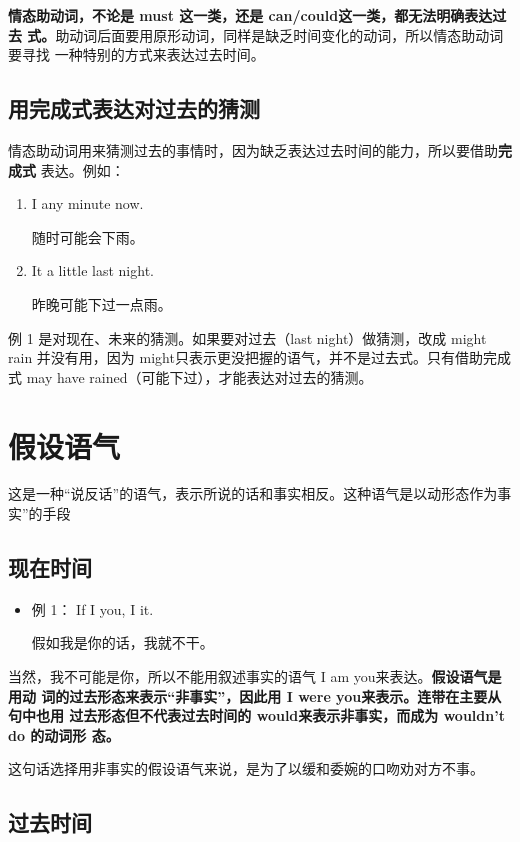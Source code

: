 \textbf{情态助动词，不论是 must 这一类，还是 can/could这一类，都无法明确表达过去
  式。}助动词后面要用原形动词，同样是缺乏时间变化的动词，所以情态助动词要寻找
一种特别的方式来表达过去时间。

\subsection{用完成式表达对过去的猜测}

情态助动词用来猜测过去的事情时，因为缺乏表达过去时间的能力，所以要借助\textbf{完成式}
表达。例如：
\begin{enumerate}
\item  I  any minute now.

  随时可能会下雨。
\item  It  a little last night.

  昨晚可能下过一点雨。
\end{enumerate}
例 1 是对现在、未来的猜测。如果要对过去（last night）做猜测，改成 might rain
并没有用，因为 might只表示更没把握的语气，并不是过去式。只有借助完成式 may
have rained（可能下过），才能表达对过去的猜测。

\section{假设语气}

这是一种“说反话”的语气，表示所说的话和事实相反。这种语气是以动形态作为事
实”的手段

\subsection{现在时间}

\begin{itemize}
\item  例 1： If I  you, I  it.

  假如我是你的话，我就不干。
\end{itemize}
当然，我不可能是你，所以不能用叙述事实的语气 I am you来表达。\textbf{假设语气是用动
  词的过去形态来表示“非事实”，因此用 I were you来表示。连带在主要从句中也用
  过去形态但不代表过去时间的 would来表示非事实，而成为 wouldn't do 的动词形
  态。}

这句话选择用非事实的假设语气来说，是为了以缓和委婉的口吻劝对方不事。

\subsection{过去时间}

